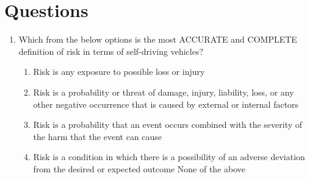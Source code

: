 \section{Questions}
\label{questions_safety_for_self_driving_cars}

\begin{enumerate}
\item Which from the below options is the most ACCURATE and COMPLETE definition of risk in terms of self-driving vehicles?
	\begin{enumerate}
		\item Risk is any exposure to possible loss or injury
		\item Risk is a probability or threat of damage, injury, liability, loss, or any other negative occurrence that is caused by external or internal factors
		\item Risk is a probability that an event occurs combined with the severity of the harm that the event can cause
		\item Risk is a condition in which there is a possibility of an adverse deviation from the desired or expected outcome
		\itme None of the above
	\end{enumerate}
	

\end{enumerate}
